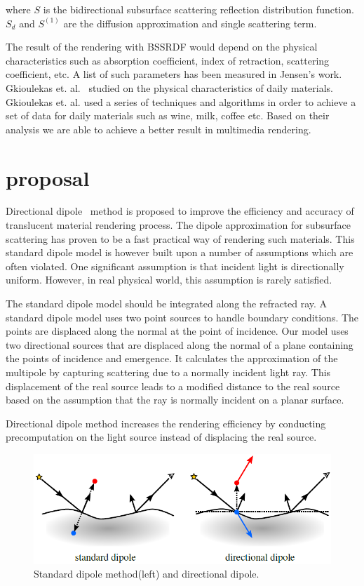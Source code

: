 \documentclass[12pt]{article}
\begin{document}
where $S$ is the bidirectional subsurface scattering reflection distribution
function. $S_d$ and $S^{(1)}$ are the diffusion approximation and
single scattering term.

The result of the rendering with BSSRDF would depend on the physical
characteristics such as absorption coefficient, index of retraction,
scattering coefficient, etc. A list of such parameters has been
measured in Jensen's work. Gkioulekas et. al.~\cite{materials} studied on the
physical characteristics of daily materials. Gkioulekas et. al. used a
series of techniques and algorithms in order to achieve a set of data
for daily materials such as wine, milk, coffee etc. Based on their
analysis we are able to achieve a better result in multimedia
rendering.

\section{proposal}
Directional dipole~\cite{direction} method is proposed to improve the efficiency and
accuracy of translucent material rendering process.
The dipole approximation for subsurface scattering has proven to be a
fast practical way of rendering such materials. This standard dipole
model is however built upon a number of assumptions which are often
violated. One significant assumption is that incident light is
directionally uniform. However, in real physical world, this
assumption is rarely satisfied.

The standard dipole model should be integrated along the refracted
ray.
A standard dipole model uses two point sources to handle boundary
conditions. The points are displaced along the normal at the point of
incidence. Our model uses two directional sources that are displaced
along the normal of a plane containing the points of incidence and
emergence. It calculates the approximation of the multipole by capturing scattering due to a
normally incident light ray. This displacement
of the real source leads to a modified distance to the real source
based on the assumption that the ray is normally incident on a planar surface.

Directional dipole method increases the rendering efficiency by
conducting precomputation on the light source instead of displacing
the real source.

\begin{figure}[!ht]
  \centering
  \includegraphics[scale=0.5]{dipoles.png}
  \caption{Standard dipole method(left) and directional dipole.}
  \label{fig:dipole}
\end{figure}
\end{document}
